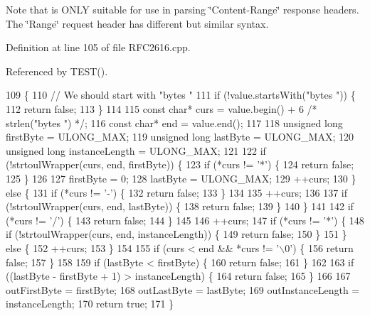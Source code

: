 Note that is O\+N\+LY suitable for use in parsing \char`\"{}\+Content-\/\+Range\char`\"{} response headers. The \char`\"{}\+Range\char`\"{} request header has different but similar syntax. 

Definition at line 105 of file R\+F\+C2616.\+cpp.



Referenced by T\+E\+S\+T().


\begin{DoxyCode}
109                                       \{
110   \textcolor{comment}{// We should start with "bytes "}
111   \textcolor{keywordflow}{if} (!value.startsWith(\textcolor{stringliteral}{"bytes "})) \{
112     \textcolor{keywordflow}{return} \textcolor{keyword}{false};
113   \}
114 
115   \textcolor{keyword}{const} \textcolor{keywordtype}{char}* curs = value.begin() + 6 \textcolor{comment}{/* strlen("bytes ") */};
116   \textcolor{keyword}{const} \textcolor{keywordtype}{char}* end = value.end();
117 
118   \textcolor{keywordtype}{unsigned} \textcolor{keywordtype}{long} firstByte = ULONG\_MAX;
119   \textcolor{keywordtype}{unsigned} \textcolor{keywordtype}{long} lastByte = ULONG\_MAX;
120   \textcolor{keywordtype}{unsigned} \textcolor{keywordtype}{long} instanceLength = ULONG\_MAX;
121 
122   \textcolor{keywordflow}{if} (!strtoulWrapper(curs, end, firstByte)) \{
123     \textcolor{keywordflow}{if} (*curs != \textcolor{charliteral}{'*'}) \{
124       \textcolor{keywordflow}{return} \textcolor{keyword}{false};
125     \}
126 
127     firstByte = 0;
128     lastByte = ULONG\_MAX;
129     ++curs;
130   \} \textcolor{keywordflow}{else} \{
131     \textcolor{keywordflow}{if} (*curs != \textcolor{charliteral}{'-'}) \{
132       \textcolor{keywordflow}{return} \textcolor{keyword}{false};
133     \}
134 
135     ++curs;
136 
137     \textcolor{keywordflow}{if} (!strtoulWrapper(curs, end, lastByte)) \{
138       \textcolor{keywordflow}{return} \textcolor{keyword}{false};
139     \}
140   \}
141 
142   \textcolor{keywordflow}{if} (*curs != \textcolor{charliteral}{'/'}) \{
143     \textcolor{keywordflow}{return} \textcolor{keyword}{false};
144   \}
145 
146   ++curs;
147   \textcolor{keywordflow}{if} (*curs != \textcolor{charliteral}{'*'}) \{
148     \textcolor{keywordflow}{if} (!strtoulWrapper(curs, end, instanceLength)) \{
149       \textcolor{keywordflow}{return} \textcolor{keyword}{false};
150     \}
151   \} \textcolor{keywordflow}{else} \{
152     ++curs;
153   \}
154 
155   \textcolor{keywordflow}{if} (curs < end && *curs != \textcolor{charliteral}{'\(\backslash\)0'}) \{
156     \textcolor{keywordflow}{return} \textcolor{keyword}{false};
157   \}
158 
159   \textcolor{keywordflow}{if} (lastByte < firstByte) \{
160     \textcolor{keywordflow}{return} \textcolor{keyword}{false};
161   \}
162 
163   \textcolor{keywordflow}{if} ((lastByte - firstByte + 1) > instanceLength) \{
164     \textcolor{keywordflow}{return} \textcolor{keyword}{false};
165   \}
166 
167   outFirstByte = firstByte;
168   outLastByte = lastByte;
169   outInstanceLength = instanceLength;
170   \textcolor{keywordflow}{return} \textcolor{keyword}{true};
171 \}
\end{DoxyCode}
